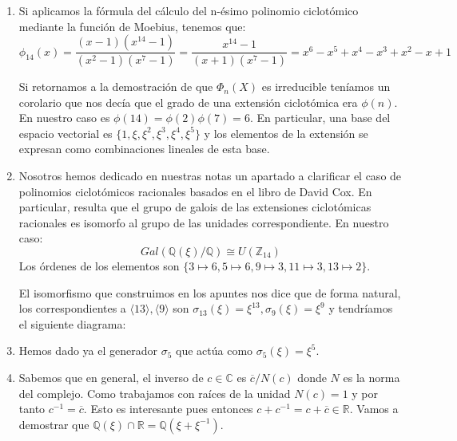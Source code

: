 \begin{enumerate}
\item Si aplicamos la fórmula del cálculo del n-ésimo polinomio ciclotómico mediante la función de Moebius, tenemos que: $$\phi_{14}(x) = \frac{(x-1)(x^{14}-1)}{(x^2 - 1)(x^7 - 1)} = \frac{x^{14}-1}{(x+1)(x^7-1)} = x^6-x^5+x^4-x^3+x^2-x+1$$

Si retornamos a la demostración de que $\Phi_n(X)$ es irreducible teníamos un corolario que nos decía que el grado de una extensión ciclotómica era $\phi(n)$. En nuestro caso es $\phi(14) = \phi(2) \phi(7) = 6$. En particular, una base del espacio vectorial es $\{1,\xi,\xi^2,\xi^3,\xi^4,\xi^5 \}$ y los elementos de la extensión se expresan como combinaciones lineales de esta base. 

\item Nosotros hemos dedicado en nuestras notas un apartado a clarificar el caso de polinomios ciclotómicos racionales basados en el libro de David Cox. En particular, resulta que el grupo de galois de las extensiones ciclotómicas racionales es isomorfo al grupo de las unidades correspondiente. En nuestro caso: $$Gal(\mathbb{Q}(\xi)/\mathbb{Q}) \cong U(\mathbb{Z}_{14})$$ Los órdenes de los elementos son $\{3 \mapsto 6,5 \mapsto 6,9 \mapsto 3, 11 \mapsto 3, 13 \mapsto 2 \}$.

El isomorfismo que construimos en los apuntes nos dice que de forma natural, los correspondientes a $\langle 13 \rangle, \langle 9 \rangle$ son $\sigma_{13}(\xi) = \xi^{13},\sigma_{9}(\xi) = \xi^9$ y tendríamos el siguiente diagrama:


\item Hemos dado ya el generador $\sigma_{5}$ que actúa como $\sigma_{5}(\xi) = \xi^5$.

\item Sabemos que en general, el inverso de $c \in \mathbb{C}$ es $\overline{c}/N(c)$ donde $N$ es la norma del complejo. Como trabajamos con raíces de la unidad $N(c) = 1$ y por tanto $c^{-1} = \overline{c}$. Esto es interesante pues entonces $c+c^{-1} = c+\overline{c} \in \mathbb{R}$. Vamos a demostrar que  $\mathbb{Q}(\xi) \cap \mathbb{R} = \mathbb{Q}(\xi + \xi^{-1})$. 


\end{enumerate}
